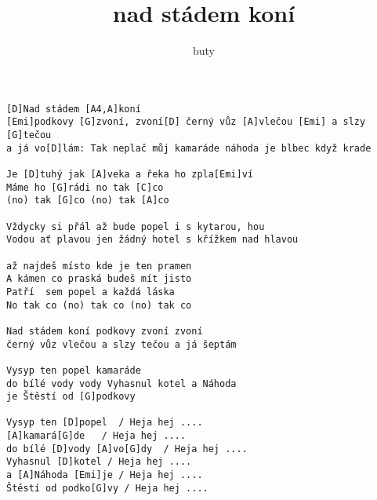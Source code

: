 \author{buty}
\title{nad stádem koní}
\maketitle
\begin{verbatim}
[D]Nad stádem [A4,A]koní
[Emi]podkovy [G]zvoní, zvoní[D] černý vůz [A]vlečou [Emi] a slzy [G]tečou
a já vo[D]lám: Tak neplač můj kamaráde náhoda je blbec když krade

Je [D]tuhý jak [A]veka a řeka ho zpla[Emi]ví
Máme ho [G]rádi no tak [C]co
(no) tak [G]co (no) tak [A]co

Vždycky si přál až bude popel i s kytarou, hou
Vodou ať plavou jen žádný hotel s křížkem nad hlavou

až najdeš místo kde je ten pramen
A kámen co praská budeš mít jisto
Patří  sem popel a každá láska
No tak co (no) tak co (no) tak co

Nad stádem koní podkovy zvoní zvoní
černý vůz vlečou a slzy tečou a já šeptám

Vysyp ten popel kamaráde
do bílé vody vody Vyhasnul kotel a Náhoda
je Štěstí od [G]podkovy

Vysyp ten [D]popel  / Heja hej ....
[A]kamará[G]de   / Heja hej ....
do bílé [D]vody [A]vo[G]dy  / Heja hej .... 
Vyhasnul [D]kotel / Heja hej ....
a [A]Náhoda [Emi]je / Heja hej ....
Štěstí od podko[G]vy / Heja hej ....
\end{verbatim}